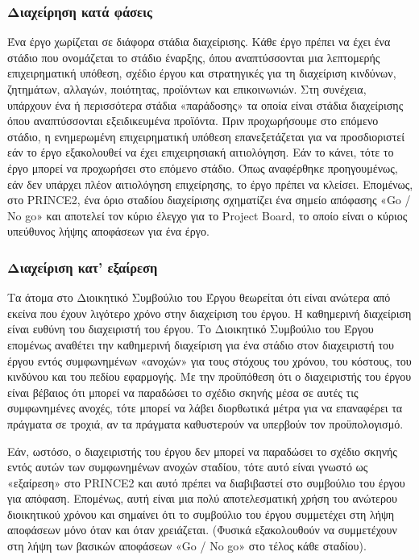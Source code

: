 \documentclass[12pt]{turabian-researchpaper}
\begin{document}
\subsubsection{Διαχείρηση κατά φάσεις}
Ένα έργο χωρίζεται σε διάφορα στάδια διαχείρισης. Κάθε έργο πρέπει να έχει ένα στάδιο που ονομάζεται το στάδιο έναρξης, όπου αναπτύσσονται μια λεπτομερής επιχειρηματική υπόθεση, σχέδιο έργου και στρατηγικές για τη διαχείριση κινδύνων, ζητημάτων, αλλαγών, ποιότητας, προϊόντων και επικοινωνιών. Στη συνέχεια, υπάρχουν ένα ή περισσότερα στάδια «παράδοσης» τα οποία είναι στάδια διαχείρισης όπου αναπτύσσονται εξειδικευμένα προϊόντα. Πριν προχωρήσουμε στο επόμενο στάδιο, η ενημερωμένη επιχειρηματική υπόθεση επανεξετάζεται για να προσδιοριστεί εάν το έργο εξακολουθεί να έχει επιχειρησιακή αιτιολόγηση. Εάν το κάνει, τότε το έργο μπορεί να προχωρήσει στο επόμενο στάδιο. Όπως αναφέρθηκε προηγουμένως, εάν δεν υπάρχει πλέον αιτιολόγηση επιχείρησης, το έργο πρέπει να κλείσει. Επομένως, στο PRINCE2, ένα όριο σταδίου διαχείρισης σχηματίζει ένα σημείο απόφασης «Go / No go» και αποτελεί τον κύριο έλεγχο για το Project Board, το οποίο είναι ο κύριος υπεύθυνος λήψης αποφάσεων για ένα έργο.

\subsubsection{Διαχείριση κατ' εξαίρεση}
Τα άτομα στο Διοικητικό Συμβούλιο του Έργου θεωρείται ότι είναι ανώτερα από εκείνα που έχουν λιγότερο χρόνο στην διαχείριση του έργου. Η καθημερινή διαχείριση είναι ευθύνη του διαχειριστή του έργου. Το Διοικητικό Συμβούλιο του Έργου επομένως αναθέτει την καθημερινή διαχείριση για ένα στάδιο στον διαχειριστή του έργου εντός συμφωνημένων «ανοχών» για τους στόχους του χρόνου, του κόστους, του κινδύνου και του πεδίου εφαρμογής. Με την προϋπόθεση ότι ο διαχειριστής του έργου είναι βέβαιος ότι μπορεί να παραδώσει το σχέδιο σκηνής μέσα σε αυτές τις συμφωνημένες ανοχές, τότε μπορεί να λάβει διορθωτικά μέτρα για να επαναφέρει τα πράγματα σε τροχιά, αν τα πράγματα καθυστερούν να υπερβούν τον προϋπολογισμό.

Εάν, ωστόσο, ο διαχειριστής του έργου δεν μπορεί να παραδώσει το σχέδιο σκηνής εντός αυτών των συμφωνημένων ανοχών σταδίου, τότε αυτό είναι γνωστό ως «εξαίρεση» στο PRINCE2 και αυτό πρέπει να διαβιβαστεί στο συμβούλιο του έργου για απόφαση. Επομένως, αυτή είναι μια πολύ αποτελεσματική χρήση του ανώτερου διοικητικού χρόνου και σημαίνει ότι το συμβούλιο του έργου συμμετέχει στη λήψη αποφάσεων μόνο όταν και όταν χρειάζεται. (Φυσικά εξακολουθούν να συμμετέχουν στη λήψη των βασικών αποφάσεων «Go / No go» στο τέλος κάθε σταδίου).
\end{document}
